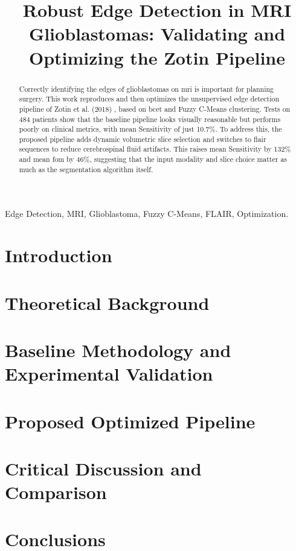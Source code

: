 \documentclass[conference]{IEEEtran}
\begin{document}
\title{Robust Edge Detection in MRI Glioblastomas: Validating and Optimizing the Zotin Pipeline}
\author{
}
\maketitle 
\begin{abstract}
Correctly identifying the edges of glioblastomas on \gls{mri} is important for planning surgery. This work reproduces and then optimizes the unsupervised edge detection pipeline of Zotin et al. (2018) \cite{zotin2018edge}, based on \gls{bcet} and Fuzzy C-Means clustering. Tests on 484 patients show that the baseline pipeline looks visually reasonable but performs poorly on clinical metrics, with mean Sensitivity of just 10.7\%. To address this, the proposed pipeline adds dynamic volumetric slice selection and switches to \gls{flair} sequences to reduce cerebrospinal fluid artifacts. This raises mean Sensitivity by 132\% and mean \gls{fom} by 46\%, suggesting that the input modality and slice choice matter as much as the segmentation algorithm itself.
\end{abstract}
\begin{IEEEkeywords}
Edge Detection, MRI, Glioblastoma, Fuzzy C-Means, FLAIR, Optimization.
\end{IEEEkeywords}
\section{Introduction}\label{sec:intro}

\section{Theoretical Background}\label{sec:background}

\section{Baseline Methodology and Experimental Validation}\label{sec:baseline}

\section{Proposed Optimized Pipeline}\label{sec:optimized}

\section{Critical Discussion and Comparison}\label{sec:comparison}

\section{Conclusions}\label{sec:conclusions}

 

\end{document}
